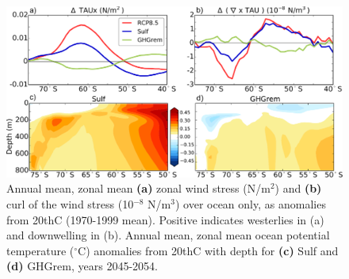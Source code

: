 \documentclass[draft,grl]{AGUTeX}  %
\begin{document}
\begin{article}
\begin{figure}[htbp] %
\centering
 \noindent\includegraphics[width=35pc]{figures/TAUcurl_TEMPanomMOCeddy+eul.pdf}
\caption{Annual mean, zonal mean \textbf{(a)} zonal wind stress (N/m$^2$) and \textbf{(b)} curl of the wind stress (10$^{-8}$ N/m$^3$) over ocean only, as anomalies from 20thC (1970-1999 mean). Positive indicates westerlies in (a) and downwelling in (b). Annual mean, zonal mean ocean potential temperature ($^\circ$C) anomalies from 20thC with depth for \textbf{(c)} Sulf and \textbf{(d)} GHGrem, years 2045-2054.}
\label{fig:zmtautemp}
\end{figure}


\end{article}
\end{document}
